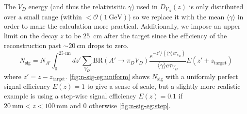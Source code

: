 The $V_D$ energy (and thus the relativisitic $\gamma$) used in $D_{V_D}(z)$
is only distributed over a small range (within $<\mathcal{O}(\qty{1}{\GeV})$)
so we replace it with the mean $\langle\gamma\rangle$ in order to make the
calculation more practical.
Additionally, we impose an upper limit on the decay $z$ to be \qty{25}{\cm} after
the target since the efficiency of the reconstruction past $\sim\qty{20}{\cm}$ drops to zero.
\begin{equation}
  N_\mathrm{sig} = N_{A'}
    \int_{0}^{\qty{25}{\cm}} dz'
    \sum_{V_D} \mathrm{BR}(A'\to\pi_D V_D)
    \frac{e^{-z'/(\langle\gamma\rangle c \tau_{V_D})}}{\langle\gamma\rangle c \tau_{V_D}}
    E(z'+z_\mathrm{target})
\end{equation}
where $z' = z-z_\mathrm{target}$.
\cref{fig:n-sig-eg:uniform} shows $N_\mathrm{sig}$ with a uniformly perfect signal efficiency
$E(z) = 1$ to give a sense of scale, but a slightly more realistic example is using a
step-wise signal efficiency $E(z) = 0.1$ if $\qty{20}{\mm} < z < \qty{100}{\mm}$ and $0$ otherwise
\cref{fig:n-sig-eg:step}.

